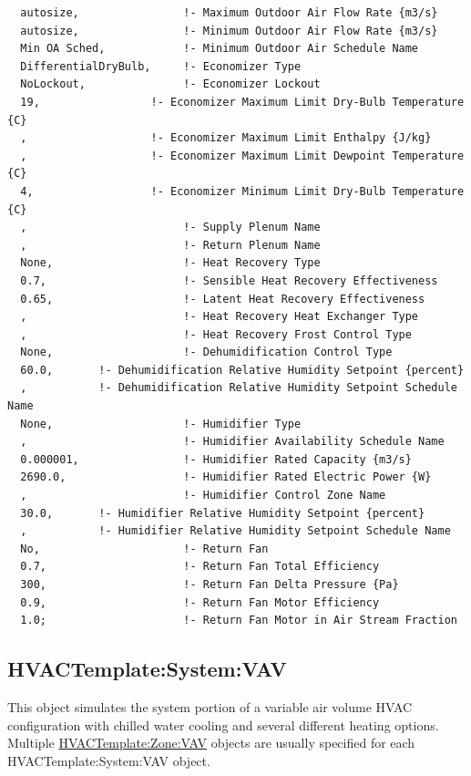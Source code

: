 \begin{lstlisting}
  autosize,                !- Maximum Outdoor Air Flow Rate {m3/s}
  autosize,                !- Minimum Outdoor Air Flow Rate {m3/s}
  Min OA Sched,            !- Minimum Outdoor Air Schedule Name
  DifferentialDryBulb,     !- Economizer Type
  NoLockout,               !- Economizer Lockout
  19,                 !- Economizer Maximum Limit Dry-Bulb Temperature {C}
  ,                   !- Economizer Maximum Limit Enthalpy {J/kg}
  ,                   !- Economizer Maximum Limit Dewpoint Temperature {C}
  4,                  !- Economizer Minimum Limit Dry-Bulb Temperature {C}
  ,                        !- Supply Plenum Name
  ,                        !- Return Plenum Name
  None,                    !- Heat Recovery Type
  0.7,                     !- Sensible Heat Recovery Effectiveness
  0.65,                    !- Latent Heat Recovery Effectiveness
  ,                        !- Heat Recovery Heat Exchanger Type
  ,                        !- Heat Recovery Frost Control Type
  None,                    !- Dehumidification Control Type
  60.0,       !- Dehumidification Relative Humidity Setpoint {percent}
  ,           !- Dehumidification Relative Humidity Setpoint Schedule Name
  None,                    !- Humidifier Type
  ,                        !- Humidifier Availability Schedule Name
  0.000001,                !- Humidifier Rated Capacity {m3/s}
  2690.0,                  !- Humidifier Rated Electric Power {W}
  ,                        !- Humidifier Control Zone Name
  30.0,       !- Humidifier Relative Humidity Setpoint {percent}
  ,           !- Humidifier Relative Humidity Setpoint Schedule Name
  No,                      !- Return Fan
  0.7,                     !- Return Fan Total Efficiency
  300,                     !- Return Fan Delta Pressure {Pa}
  0.9,                     !- Return Fan Motor Efficiency
  1.0;                     !- Return Fan Motor in Air Stream Fraction
\end{lstlisting}

\subsection{HVACTemplate:System:VAV}\label{hvactemplatesystemvav}

This object simulates the system portion of a variable air volume HVAC configuration with chilled water cooling and several different heating options. Multiple \hyperref[hvactemplatezonevav]{HVACTemplate:Zone:VAV} objects are usually specified for each HVACTemplate:System:VAV object.

